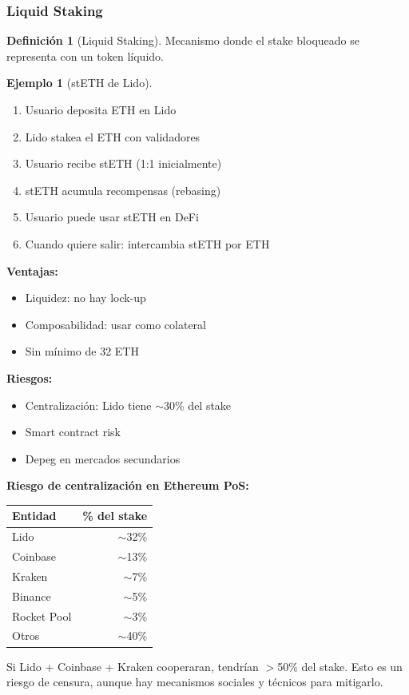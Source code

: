 \documentclass[11pt,a4paper,twoside,openright]{book}
\theoremstyle{definition}
\newtheorem{definition}{Definición}[chapter]
\newtheorem{example}{Ejemplo}[chapter]
\theoremstyle{plain}
\theoremstyle{remark}
\begin{document}
\subsubsection{Liquid Staking}

\begin{definition}[Liquid Staking]
Mecanismo donde el stake bloqueado se representa con un token líquido.
\end{definition}

\begin{example}[stETH de Lido]
\begin{enumerate}
    \item Usuario deposita ETH en Lido
    \item Lido stakea el ETH con validadores
    \item Usuario recibe stETH (1:1 inicialmente)
    \item stETH acumula recompensas (rebasing)
    \item Usuario puede usar stETH en DeFi
    \item Cuando quiere salir: intercambia stETH por ETH
\end{enumerate}

\textbf{Ventajas:}
\begin{itemize}
    \item Liquidez: no hay lock-up
    \item Composabilidad: usar como colateral
    \item Sin mínimo de 32 ETH
\end{itemize}

\textbf{Riesgos:}
\begin{itemize}
    \item Centralización: Lido tiene $\sim$30\% del stake
    \item Smart contract risk
    \item Depeg en mercados secundarios
\end{itemize}
\end{example}

\begin{advertencia}
\textbf{Riesgo de centralización en Ethereum PoS:}

\begin{center}
\begin{tabular}{lr}
\toprule
\textbf{Entidad} & \textbf{\% del stake} \\
\midrule
Lido & $\sim$32\% \\
Coinbase & $\sim$13\% \\
Kraken & $\sim$7\% \\
Binance & $\sim$5\% \\
Rocket Pool & $\sim$3\% \\
Otros & $\sim$40\% \\
\bottomrule
\end{tabular}
\end{center}

Si Lido + Coinbase + Kraken cooperaran, tendrían $>$50\% del stake. Esto es un riesgo de censura, aunque hay mecanismos sociales y técnicos para mitigarlo.
\end{advertencia}
\end{document}
